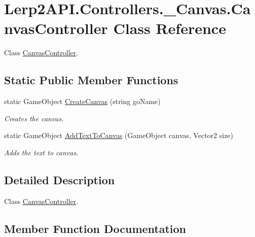\hypertarget{class_lerp2_a_p_i_1_1_controllers_1_1___canvas_1_1_canvas_controller}{}\section{Lerp2\+A\+P\+I.\+Controllers.\+\_\+\+Canvas.\+Canvas\+Controller Class Reference}
\label{class_lerp2_a_p_i_1_1_controllers_1_1___canvas_1_1_canvas_controller}


Class \hyperlink{class_lerp2_a_p_i_1_1_controllers_1_1___canvas_1_1_canvas_controller}{Canvas\+Controller}.  


\subsection*{Static Public Member Functions}
\begin{DoxyCompactItemize}
\item 
static Game\+Object \hyperlink{class_lerp2_a_p_i_1_1_controllers_1_1___canvas_1_1_canvas_controller_aaec67c623580d1b551b44126a89f97f3}{Create\+Canvas} (string go\+Name)
\begin{DoxyCompactList}\small\item\em Creates the canvas. \end{DoxyCompactList}\item 
static Game\+Object \hyperlink{class_lerp2_a_p_i_1_1_controllers_1_1___canvas_1_1_canvas_controller_a0e32a8bdfb94b694402bb3a7bdfd4dd7}{Add\+Text\+To\+Canvas} (Game\+Object canvas, Vector2 size)
\begin{DoxyCompactList}\small\item\em Adds the text to canvas. \end{DoxyCompactList}\end{DoxyCompactItemize}


\subsection{Detailed Description}
Class \hyperlink{class_lerp2_a_p_i_1_1_controllers_1_1___canvas_1_1_canvas_controller}{Canvas\+Controller}. 



\subsection{Member Function Documentation}
\mbox{\label{class_lerp2_a_p_i_1_1_controllers_1_1___canvas_1_1_canvas_controller_a0e32a8bdfb94b694402bb3a7bdfd4dd7}} 
